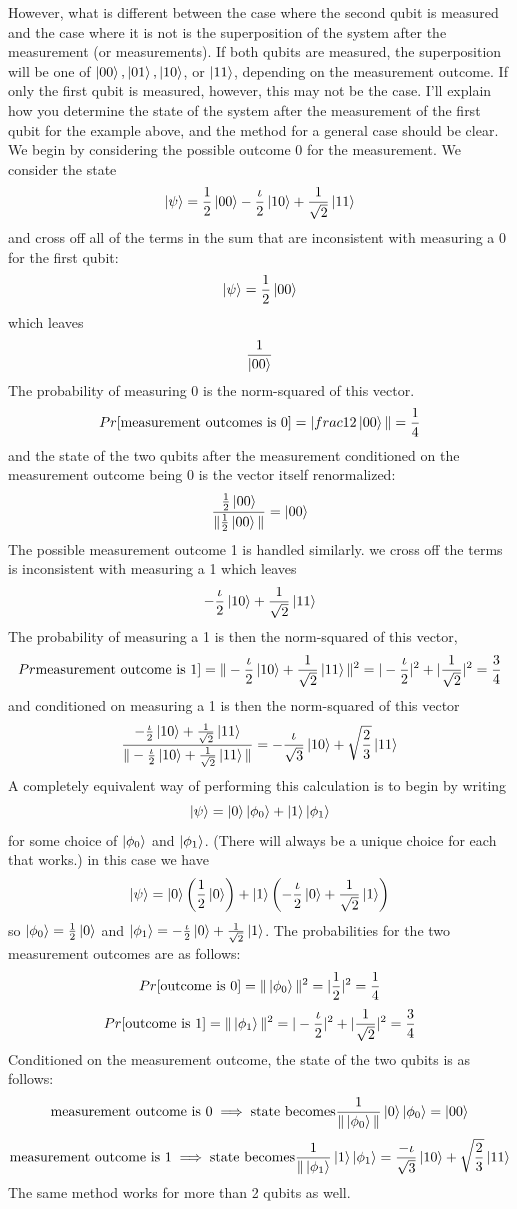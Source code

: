 However, what is different between the case where the second qubit is measured and the case
where it is not is the superposition of the system after the measurement (or measurements). If both
qubits are measured, the superposition will be one of $\ket{00},\ket{01},\ket{10}$, or $\ket{11}$, depending on the
measurement outcome. If only the first qubit is measured, however, this may not be the case.
I’ll explain how you determine the state of the system after the measurement of the first qubit
for the example above, and the method for a general case should be clear. We begin by considering
the possible outcome 0 for the measurement. We consider the state
\[
\ket{\psi}=\frac{1}{2}\ket{00}-\frac{\iota}{2}\ket{10}+\frac{1}{\sqrt{2}}\ket{11}
\]
and cross off all of the terms in the sum that are inconsistent with measuring a $0$ for the first qubit:
\[
\ket{\psi}=\frac{1}{2}\ket{00}
\]
which leaves
\[
\frac{1}{\ket{00}}
\]
The probability of measuring 0 is the norm-squared of this vector.
\[
Pr\text{[measurement outcomes is 0]}=|\\frac{1}{2}\ket{00}\|=\frac{1}{4}
\]
and the state of the two qubits after the measurement conditioned on the measurement outcome being 0 is the vector itself renormalized:
\[
\frac{\frac{1}{2}\ket{00}}{\|\frac{1}{2}\ket{00}\|}=\ket{00}
\]
The possible measurement outcome 1 is handled similarly. we cross off the terms is inconsistent with measuring a 1 which leaves
\[
-\frac{\iota}{2}\ket{10}+\frac{1}{\sqrt{2}}\ket{11}
\]
The probability of measuring a 1 is then the norm-squared of this vector,
\[
Pr\text{measurement outcome is 1]}=\|-\frac{\iota}{2}\ket{10}+\frac{1}{\sqrt{2}}\ket{11}\|^2=|-\frac{\iota}{2}|^2+|\frac{1}{\sqrt{2}}|^2=\frac{3}{4}
\]
and conditioned on measuring a 1 is then the norm-squared of this vector
\[
\frac{-\frac{\iota}{2}\ket{10}+\frac{1}{\sqrt{2}}\ket{11}}{\|-\frac{\iota}{2}\ket{10}+\frac{1}{\sqrt{2}}\ket{11}\|}=-\frac{\iota}{\sqrt{3}}\ket{10}+\sqrt{\frac{2}{3}}\ket{11}
\]
A completely equivalent way of performing this calculation is to begin by writing
\[
\ket{\psi}=\ket{0}\ket{\phi_0}+\ket{1}\ket{\phi_1}
\]
for some choice of $\ket{\phi_0}$ and $\ket{\phi_1}$. (There will always be a unique choice for each that works.) in this case we have
\[
\ket{\psi}=\ket{0}\left(\frac{1}{2}\ket{0}\right)+\ket{1}\left(-\frac{\iota}{2}\ket{0}+\frac{1}{\sqrt{2}}\ket{1}\right)
\]
so $\ket{\phi_0}=\frac{1}{2}\ket{0}$ and $\ket{\phi_1}=-\frac{\iota}{2}\ket{0}+\frac{1}{\sqrt{2}}\ket{1}$. The probabilities for the two measurement outcomes are as follows:
\[
Pr\text{[outcome is 0]}=\|\ket{\phi_0}\|^2=|\frac{1}{2}|^2=\frac{1}{4}
\]
\[
Pr\text{[outcome is 1]}=\|\ket{\phi_1}\|^2=|-\frac{\iota}{2}|^2+|\frac{1}{\sqrt{2}}|^2=\frac{3}{4}
\]
Conditioned on the measurement outcome, the state of the two qubits is as follows:
\[
\text{measurement outcome is 0}\implies \text{state becomes} \frac{1}{\|\ket{\phi_0}\|}\ket{0}\ket{\phi_0}=\ket{00}
\]
\[
\text{measurement outcome is 1} \implies \text{state becomes}\frac{1}{\|\ket{\phi_1}}\ket{1}\ket{\phi_1}=\frac{-\iota}{\sqrt{3}}\ket{10}+\sqrt{\frac{2}{3}}\ket{11}
\]
The same method works for more than 2 qubits as well.

